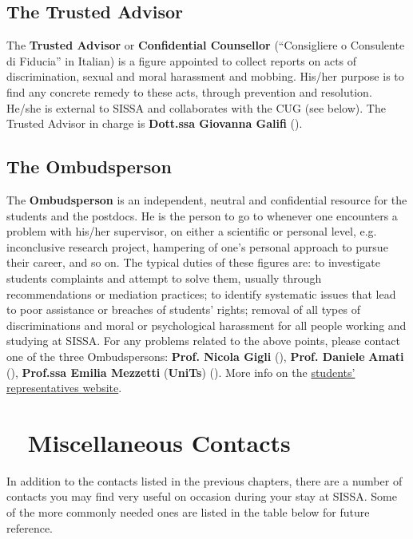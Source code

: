 \documentclass{sissavademecum}
\begin{document}
\section{The Trusted Advisor}

The \textbf{Trusted Advisor} or \textbf{Confidential Counsellor }(``Consigliere o Consulente di Fiducia'' in Italian) is a figure appointed to collect reports on acts of discrimination, sexual and moral harassment and mobbing. His/her purpose is to find any concrete remedy to these acts, through prevention and resolution. He/she is external to SISSA and collaborates with the CUG (see below). The Trusted Advisor in charge is \textbf{Dott.ssa Giovanna Galifi} ().
 

\section{The Ombudsperson}

The \textbf{Ombudsperson} is an independent, neutral and confidential resource for the students and the postdocs. He is the person to go to whenever one encounters a problem with his/her supervisor, on either a scientific or personal level, e.g. inconclusive research project, hampering of one's personal approach to pursue their career, and so on. The typical duties of these figures are: to investigate students complaints and attempt to solve them, usually through recommendations or mediation practices; to identify systematic issues that lead to poor assistance or breaches of students' rights; removal of all types of discriminations and moral or psychological harassment for all people working and studying at SISSA. For any problems related to the above points, please contact one of the three Ombudspersons: \textbf{Prof. Nicola Gigli} (), \textbf{Prof. Daniele }\textbf{Amati} (), \textbf{Prof.ssa Emilia Mezzetti} (\textbf{UniTs}) \textbf{}(). More info on the \href{http://students.sissa.it/issues/ombudsperson.html}{students' representatives website}.



\chapter{\texorpdfstring{\faAddressBook\ }{} Miscellaneous Contacts}

In addition to the contacts listed in the previous chapters, there are a number of contacts you may find very useful on occasion during your stay at SISSA. Some of the more commonly needed ones are listed in the table below for future reference.
\end{document}
